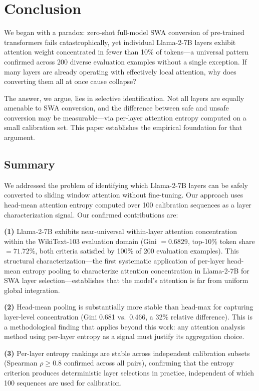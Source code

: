 \section{Conclusion}
\label{sec:conclusion}

We began with a paradox: zero-shot full-model SWA conversion of pre-trained transformers fails catastrophically, yet individual Llama-2-7B layers exhibit attention weight concentrated in fewer than 10\% of tokens---a universal pattern confirmed across 200 diverse evaluation examples without a single exception. If many layers are already operating with effectively local attention, why does converting them all at once cause collapse?

The answer, we argue, lies in selective identification. Not all layers are equally amenable to SWA conversion, and the difference between safe and unsafe conversion may be measurable---via per-layer attention entropy computed on a small calibration set. This paper establishes the empirical foundation for that argument.

\subsection*{Summary}

We addressed the problem of identifying which Llama-2-7B layers can be safely converted to sliding window attention without fine-tuning. Our approach uses head-mean attention entropy computed over 100 calibration sequences as a layer characterization signal. Our confirmed contributions are:

\textbf{(1)} Llama-2-7B exhibits near-universal within-layer attention concentration within the WikiText-103 evaluation domain (Gini $= 0.6829$, top-10\% token share $= 71.72\%$, both criteria satisfied by 100\% of 200 evaluation examples). This structural characterization---the first systematic application of per-layer head-mean entropy pooling to characterize attention concentration in Llama-2-7B for SWA layer selection---establishes that the model's attention is far from uniform global integration.

\textbf{(2)} Head-mean pooling is substantially more stable than head-max for capturing layer-level concentration (Gini 0.681 vs.\ 0.466, a 32\% relative difference). This is a methodological finding that applies beyond this work: any attention analysis method using per-layer entropy as a signal must justify its aggregation choice.

\textbf{(3)} Per-layer entropy rankings are stable across independent calibration subsets (Spearman $\rho \geq 0.8$ confirmed across all pairs), confirming that the entropy criterion produces deterministic layer selections in practice, independent of which 100 sequences are used for calibration.

